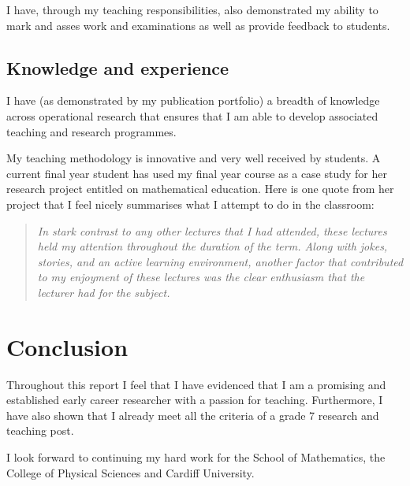 \documentclass{article}
\begin{document}
I have, through my teaching responsibilities, also demonstrated my ability to mark and asses work and examinations as well as provide feedback to students.

\subsection{Knowledge and experience}

I have (as demonstrated by my publication portfolio) a breadth of knowledge across operational research that ensures that I am able to develop associated teaching and research programmes.

My teaching methodology is innovative and very well received by students.
A current final year student has used my final year course as a case study for her research project entitled on mathematical education.
Here is one quote from her project that I feel nicely summarises what I attempt to do in the classroom:

\begin{quote}
\textit{In stark contrast to any other lectures that I had attended, these lectures held my attention throughout the duration of the term. Along with jokes, stories, and an active learning environment, another factor that contributed to my enjoyment of these lectures was the clear enthusiasm that the lecturer had for the subject.}
\end{quote}

\section{Conclusion}\label{sec:conclusion}

Throughout this report I feel that I have evidenced that I am a promising and established early career researcher with a passion for teaching. Furthermore, I have also shown that I already meet all the criteria of a grade 7 research and teaching post.

I look forward to continuing my hard work for the School of Mathematics, the College of Physical Sciences and Cardiff University.



\end{document}
